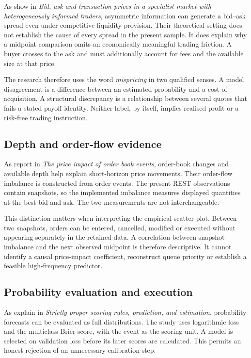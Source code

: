 As  show in \textit{Bid, ask and transaction prices in a specialist market with heterogeneously informed traders}, asymmetric information can generate a bid--ask spread even under competitive liquidity provision. Their theoretical setting does not establish the cause of every spread in the present sample. It does explain why a midpoint comparison omits an economically meaningful trading friction. A buyer crosses to the ask and must additionally account for fees and the available size at that price.

The research therefore uses the word \textit{mispricing} in two qualified senses. A model disagreement is a difference between an estimated probability and a cost of acquisition. A structural discrepancy is a relationship between several quotes that fails a stated payoff identity. Neither label, by itself, implies realised profit or a risk-free trading instruction.

\subsection{Depth and order-flow evidence}
As  report in \textit{The price impact of order book events}, order-book changes and available depth help explain short-horizon price movements. Their order-flow imbalance is constructed from order events. The present REST observations contain snapshots, so the implemented imbalance measures displayed quantities at the best bid and ask. The two measurements are not interchangeable.

This distinction matters when interpreting the empirical scatter plot. Between two snapshots, orders can be entered, cancelled, modified or executed without appearing separately in the retained data. A correlation between snapshot imbalance and the next observed midpoint is therefore descriptive. It cannot identify a causal price-impact coefficient, reconstruct queue priority or establish a feasible high-frequency predictor.

\subsection{Probability evaluation and execution}
As  explain in \textit{Strictly proper scoring rules, prediction, and estimation}, probability forecasts can be evaluated as full distributions. The study uses logarithmic loss and the multiclass Brier score, with the event as the scoring unit. A model is selected on validation loss before its later scores are calculated. This permits an honest rejection of an unnecessary calibration step.

